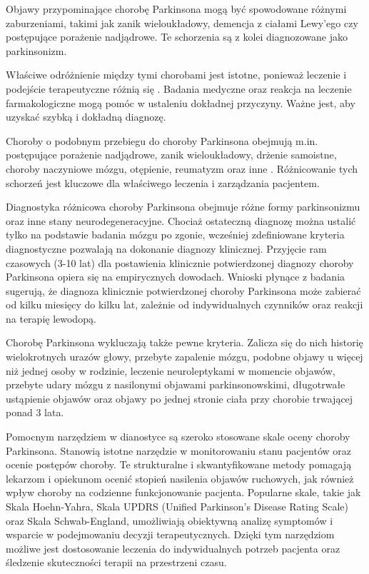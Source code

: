 Objawy przypominające chorobę Parkinsona mogą być spowodowane różnymi zaburzeniami, takimi jak zanik wieloukładowy, demencja z ciałami Lewy'ego czy postępujące porażenie nadjądrowe. Te schorzenia są z kolei diagnozowane jako parkinsonizm.

Właściwe odróżnienie między tymi chorobami jest istotne, ponieważ leczenie i podejście terapeutyczne różnią się \cite{National_Institute_on_Aging_2022}.
Badania medyczne oraz reakcja na leczenie farmakologiczne mogą pomóc w ustaleniu dokładnej przyczyny.
Ważne jest, aby uzyskać szybką i dokładną diagnozę.

Choroby o podobnym przebiegu do choroby Parkinsona obejmują m.in. postępujące porażenie nadjądrowe, zanik wieloukładowy, drżenie samoistne, choroby naczyniowe mózgu, otępienie, reumatyzm oraz inne \cite{diagnostyka_Sitek}.
Różnicowanie tych schorzeń jest kluczowe dla właściwego leczenia i zarządzania pacjentem.

Diagnostyka różnicowa choroby Parkinsona obejmuje różne formy parkinsonizmu oraz inne stany neurodegeneracyjne.
Chociaż ostateczną diagnozę można ustalić tylko na podstawie badania mózgu po zgonie, wcześniej zdefiniowane kryteria diagnostyczne pozwalają na dokonanie diagnozy klinicznej.
Przyjęcie ram czasowych (3-10 lat) dla postawienia klinicznie potwierdzonej diagnozy choroby Parkinsona opiera się na empirycznych dowodach.
Wnioski płynące z badania \cite{ROSSI202153} sugerują, że diagnoza klinicznie potwierdzonej choroby Parkinsona może zabierać od kilku miesięcy do kilku lat, zależnie od indywidualnych czynników oraz reakcji na terapię lewodopą.

Chorobę Parkinsona wykluczają także pewne kryteria.
Zalicza się do nich historię wielokrotnych urazów głowy, przebyte zapalenie mózgu, podobne objawy u więcej niż jednej osoby w rodzinie,
leczenie neuroleptykami w momencie objawów, przebyte udary mózgu z nasilonymi objawami parkinsonowskimi, długotrwałe ustąpienie objawów oraz objawy po jednej stronie ciała przy chorobie trwającej ponad 3 lata.

Pomocnym narzędziem w dianostyce są szeroko stosowane skale oceny choroby Parkinsona.
Stanowią istotne narzędzie w monitorowaniu stanu pacjentów oraz ocenie postępów choroby.
Te strukturalne i skwantyfikowane metody pomagają lekarzom i opiekunom ocenić stopień nasilenia objawów ruchowych,
jak również wpływ choroby na codzienne funkcjonowanie pacjenta.
Popularne skale, takie jak Skala Hoehn-Yahra, Skala UPDRS (Unified Parkinson's Disease Rating Scale) oraz Skala Schwab-England,
umożliwiają obiektywną analizę symptomów i wsparcie w podejmowaniu decyzji terapeutycznych.
Dzięki tym narzędziom możliwe jest dostosowanie leczenia do indywidualnych potrzeb pacjenta oraz śledzenie skuteczności terapii na przestrzeni czasu.



